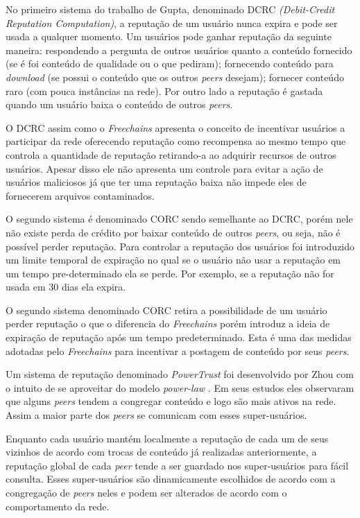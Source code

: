 \documentclass[12pt]{article}
\newcommand{\FC} {\emph{Freechains}\xspace}
\begin{document}
No primeiro sistema do trabalho de Gupta, denominado DCRC \emph{(Debit-Credit Reputation Computation)}, a reputação de um usuário nunca expira e pode ser usada a qualquer momento. Um usuários pode ganhar reputação da seguinte maneira: respondendo a pergunta de outros usuários quanto a conteúdo fornecido (se é foi conteúdo de qualidade ou o que pediram); fornecendo conteúdo para \emph{download} (se possui o conteúdo que os outros \emph{peers} desejam); fornecer conteúdo raro (com pouca instâncias na rede). Por outro lado a reputação é gastada quando um usuário baixa o conteúdo de outros \emph{peers}.

O DCRC assim como o \FC apresenta o conceito de incentivar usuários a participar da rede oferecendo reputação como recompensa ao mesmo tempo que controla a quantidade de reputação retirando-a ao adquirir recursos de outros usuários. Apesar disso ele não apresenta um controle para evitar a ação de usuários maliciosos já que ter uma reputação baixa não impede eles de fornecerem arquivos contaminados.

O segundo sistema é denominado CORC sendo semelhante ao DCRC, porém nele não existe perda de crédito por baixar conteúdo de outros \emph{peers}, ou seja, não é possível perder reputação. Para controlar a reputação dos usuários foi introduzido um limite temporal de expiração no qual se o usuário não usar a reputação em um tempo pre-determinado ela se perde. Por exemplo, se a reputação não for usada em 30 dias ela expira. 

O segundo sistema denominado CORC retira a possibilidade de um usuário perder reputação o que o diferencia do \FC porém introduz a ideia de expiração de reputação após um tempo predeterminado. Esta  é uma das medidas adotadas pelo \FC para incentivar a postagem de conteúdo por seus \emph{peers}.

Um sistema de reputação denominado \emph{PowerTrust} foi desenvolvido por Zhou com o intuito de se aproveitar do modelo \emph{power-law} \cite{zhou2007powertrust}. Em seus estudos eles observaram que alguns \emph{peers} tendem a congregar conteúdo e logo são mais ativos na rede. Assim a maior parte dos \emph{peers} se comunicam com esses super-usuários. 

Enquanto cada usuário mantém localmente a reputação de cada um de seus vizinhos de acordo com trocas de conteúdo já realizadas anteriormente, a reputação global de cada \emph{peer} tende a ser guardado nos super-usuários para fácil consulta. Esses super-usuários são dinamicamente escolhidos de acordo com a congregação de \emph{peers} neles e podem ser alterados de acordo com o comportamento da rede.
\end{document}
